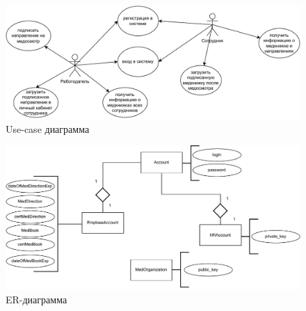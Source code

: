 \documentclass[12pt]{report}
\begin{document}
\begin{figure}[h!]
  \centering
  \includegraphics[width = \linewidth]{use-case.pdf}
  \caption{Use-case диаграмма}
  \label{fig:uc}
\end{figure}
\newpage
\begin{figure}[h!]
  \centering
  \includegraphics[width = \linewidth]{er.pdf}
  \caption{ER-диаграмма}
  \label{fig:er}
\end{figure}
\end{document}
